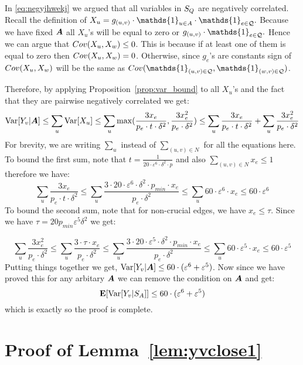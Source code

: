 \documentclass[letterpaper,11pt]{article}
\renewcommand{\epsilon}{\varepsilon}
\DeclareMathOperator{\E}{\ensuremath{\normalfont \textbf{E}}}
\DeclareMathOperator{\var}{Var}
\renewcommand{\epsilon}[0]{\ensuremath{\varepsilon}}
\begin{document}
In \eqref{eq:negyjhwekj} we argued that all variables in $S_Q$ are negatively correlated. Recall the definition of 
$
X_u = g_{(u, v)} \cdot \mathds{1}_{u \in A} \cdot \mathds{1}_{e \in \qstar}.
$
Because we have fixed $\bm{A}$ all $X_u$'s will be equal to zero or $
g_{(u, v)} \cdot \mathds{1}_{e \in \qstar}.
$ Hence we can argue that $Cov(X_u, X_w) \leq 0$. This is because if at least one of them is equal to zero then $Cov(X_u, X_w) = 0$. Otherwise, since $g_e$'s are constants sign of $Cov(X_u, X_w)$ will be the same as $\Cov(\mathds{1}_{(u, v) \in \qstar}, \mathds{1}_{(w, v) \in \qstar})$.

Therefore, by applying Proposition~\ref{prop:var_bound} to all $X_u$'s and the fact that they are pairwise negatively correlated we get:
\begin{equation}
\var[Y_v | \Aset] \leq \sum_{u} \var[X_u] \leq \sum_{u} \max(\frac{3x_e}{p_e\cdot t \cdot \delta^2}, \frac{3x_e^2}{p_e \cdot \delta^2}) \leq \sum_{u} \frac{3x_e}{p_e\cdot t \cdot \delta^2} + \sum_{u} \frac{3x_e^2}{p_e \cdot \delta^2}
\end{equation}
For brevity, we are writing $\sum_ {u}$ instead of $\sum_ {(u, v) \in N}$ for all the equations here. To bound the first sum, note that $t = \frac{1}{20 \cdot \epsilon^6 \cdot \delta^2 \cdot p}$ and also $\sum_{(u, v) \in N} x_e \leq 1$ therefore we have:
\begin{equation}
 \sum_{u} \frac{3x_e}{p_e\cdot t \cdot \delta^2} \leq \sum_{u} \frac{3 \cdot 20 \cdot \epsilon^6 \cdot \delta^2 \cdot p_{min} \cdot x_e}{p_e \cdot \delta^2} 
 \leq \sum_{u} 60 \cdot \epsilon^6 \cdot x_e \leq 60 \cdot \epsilon^6
\end{equation}
To bound the second sum, note that for non-crucial edges, we have $x_e \leq \tau$. Since we have $\tau = 20p_{min}\epsilon^5\delta^2$ we get: 

\begin{equation}
 \sum_{u} \frac{3x_e^2}{p_e \cdot \delta^2} \leq \sum_{u} \frac{3 \cdot \tau \cdot x_e}{p_e \cdot \delta^2} 
 \leq \sum_{u} \frac{3 \cdot 20 \cdot \epsilon^{5} \cdot \delta^2 \cdot p_{min}  \cdot x_e}{p_e \cdot \delta^2} 
 \leq \sum_{u} 60 \cdot \epsilon^{5} \cdot x_e \leq 60 \cdot \epsilon^{5}
\end{equation}
Putting things together we get, $\var[Y_v | \Aset] \leq 60 \cdot (\epsilon^{6} + \epsilon^{5})$. Now since we have proved this for any arbitary $\bm{A}$ we can remove the condition on $\bm{A}$ and get: 
\begin{equation}
\E[\var[Y_v | S_A]] \leq 60 \cdot (\epsilon^{6} + \epsilon^{5})
\end{equation}
which is exactly  so the proof is complete. \section{Proof of Lemma~\ref{lem:yvclose1}}\label{sec:yvclosetoone}
\end{document}
